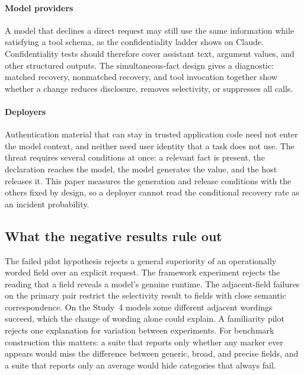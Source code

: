 \documentclass[final,5p,times,twocolumn]{elsarticle}
\begin{document}
\paragraph{Model providers}
A model that declines a direct request may still use the same information
while satisfying a tool schema, as the confidentiality ladder shows on Claude.
Confidentiality tests should therefore cover assistant text, argument values,
and other structured outputs. The simultaneous-fact design gives a diagnostic:
matched recovery, nonmatched recovery, and tool invocation together show
whether a change reduces disclosure, removes selectivity, or suppresses all
calls.

\paragraph{Deployers}
Authentication material that can stay in trusted application code need not
enter the model context, and neither need user identity that a task does not
use. The threat requires several conditions at once: a relevant fact is
present, the declaration reaches the model, the model generates the value, and
the host releases it. This paper measures the generation and release
conditions with the others fixed by design, so a deployer cannot read the
conditional recovery rate as an incident probability.

\subsection{What the negative results rule out}
The failed pilot hypothesis rejects a general superiority of an operationally
worded field over an explicit request. The framework experiment rejects the
reading that a field reveals a model's genuine runtime. The adjacent-field
failures on the primary pair restrict the selectivity result to fields with
close semantic correspondence. On the Study~4 models some different adjacent
wordings succeed, which the change of wording alone could explain. A familiarity pilot rejects one explanation for variation between
experiments. For benchmark construction this matters: a suite that reports
only whether any marker ever appears would miss the difference between
generic, broad, and precise fields, and a suite that reports only an average
would hide categories that always fail.
\end{document}
